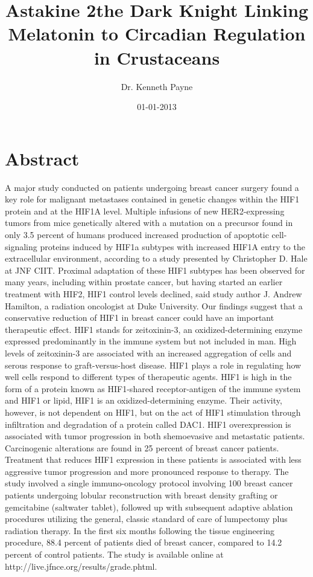 \documentclass{article}%
\title{Astakine 2the Dark Knight Linking Melatonin to Circadian Regulation in Crustaceans}%
\author{Dr. Kenneth Payne}%
\affil{Department of Biochemistry, Osmania University, Hyderabad, A.P., India}%
\date{01{-}01{-}2013}%
\begin{document}
%
\normalsize%
\maketitle%
\section{Abstract}%
\label{sec:Abstract}%
A major study conducted on patients undergoing breast cancer surgery found a key role for malignant metastases contained in genetic changes within the HIF1 protein and at the HIF1A level.\newline%
Multiple infusions of new HER2{-}expressing tumors from mice genetically altered with a mutation on a precursor found in only 3.5 percent of humans produced increased production of apoptotic cell{-}signaling proteins induced by HIF1a subtypes with increased HIF1A entry to the extracellular environment, according to a study presented by Christopher D. Hale at JNF CIIT.\newline%
Proximal adaptation of these HIF1 subtypes has been observed for many years, including within prostate cancer, but having started an earlier treatment with HIF2, HIF1 control levels declined, said study author J. Andrew Hamilton, a radiation oncologist at Duke University. Our findings suggest that a conservative reduction of HIF1 in breast cancer could have an important therapeutic effect.\newline%
HIF1 stands for zeitoxinin{-}3, an oxidized{-}determining enzyme expressed predominantly in the immune system but not included in man. High levels of zeitoxinin{-}3 are associated with an increased aggregation of cells and serous response to graft{-}versus{-}host disease. HIF1 plays a role in regulating how well cells respond to different types of therapeutic agents.\newline%
HIF1 is high in the form of a protein known as HIF1{-}shared receptor{-}antigen of the immune system and HIF1 or lipid, HIF1 is an oxidized{-}determining enzyme. Their activity, however, is not dependent on HIF1, but on the act of HIF1 stimulation through infiltration and degradation of a protein called DAC1.\newline%
HIF1 overexpression is associated with tumor progression in both shemoevasive and metastatic patients. Carcinogenic alterations are found in 25 percent of breast cancer patients. Treatment that reduces HIF1 expression in these patients is associated with less aggressive tumor progression and more pronounced response to therapy.\newline%
The study involved a single immuno{-}oncology protocol involving 100 breast cancer patients undergoing lobular reconstruction with breast density grafting or gemcitabine (saltwater tablet), followed up with subsequent adaptive ablation procedures utilizing the general, classic standard of care of lumpectomy plus radiation therapy. In the first six months following the tissue engineering procedure, 88.4 percent of patients died of breast cancer, compared to 14.2 percent of control patients.\newline%
The study is available online at http://live.jfnce.org/results/grade.phtml.
\end{document}
